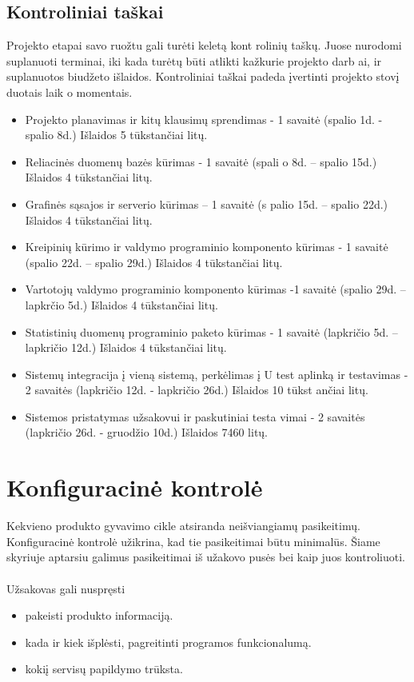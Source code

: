 \documentclass[a4paper,12pt]{article}
\begin{document}
\subsection{Kontroliniai taškai}
Projekto etapai savo ruožtu gali turėti keletą kont
rolinių taškų. Juose nurodomi suplanuoti terminai, 
iki kada turėtų būti atlikti kažkurie projekto darb
ai, ir suplanuotos biudžeto išlaidos. Kontroliniai 
taškai padeda įvertinti projekto stovį duotais laik
o momentais. 
\begin{itemize}
\item
Projekto planavimas ir kitų klausimų sprendimas - 1
 savaitė (spalio 1d. - spalio 8d.) Išlaidos 
5 tūkstančiai litų. 
\item
Reliacinės duomenų bazės kūrimas - 1 savaitė (spali
o 8d. – spalio 15d.) Išlaidos 4 
tūkstančiai litų. 
\item
Grafinės sąsajos ir serverio kūrimas – 1 savaitė (s
palio 15d. – spalio 22d.) Išlaidos 4 
tūkstančiai litų. 
\item
Kreipinių kūrimo ir valdymo programinio komponento 
kūrimas -  1 savaitė (spalio 22d. – 
spalio 29d.) Išlaidos 4 tūkstančiai litų. 
\item
Vartotojų valdymo programinio komponento kūrimas -1
 savaitė (spalio 29d. – lapkrčio 5d.) 
Išlaidos 4 tūkstančiai litų. 
\item
Statistinių duomenų programinio paketo kūrimas -  1
 savaitė (lapkričio 5d. – lapkričio 12d.) 
Išlaidos 4 tūkstančiai litų. 
\item
Sistemų integracija į vieną sistemą, perkėlimas į U
test aplinką ir testavimas - 2 savaitės 
(lapkričio 12d. - lapkričio 26d.) Išlaidos 10 tūkst
ančiai litų. 
	\item Sistemos pristatymas užsakovui ir paskutiniai testa
vimai - 2 savaitės (lapkričio 26d. - 
gruodžio 10d.) Išlaidos 7460 litų. 
\end{itemize}
 


\section{Konfiguracin\. e kontrol\. e}
Kekvieno produkto gyvavimo cikle atsiranda nei\v sviangiam\k u pasikeitim\k u.\\
Konfiguracin\. e kontrol\. e u\v zikrina, kad tie pasikeitimai b\= utu minimal\= us.
\v Siame skyriuje aptarsiu galimus pasikeitimai i\v s u\v zakovo pus\. es bei kaip juos kontroliuoti. \\
\\
U\v zsakovas gali nuspr\k esti
\begin{itemize}
	\item pakeisti produkto informacij\k a.
	\item kada ir kiek i\v spl\. esti, pagreitinti programos funkcionalum\k a.
	\item koki\k i servis\k u papildymo tr\= uksta.
\end{itemize}
\end{document}
